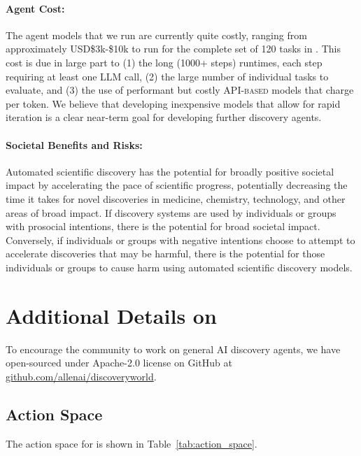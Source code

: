 \paragraph{Agent Cost:} The agent models that we run are currently quite costly, ranging from approximately USD\$3k-\$10k to run for the complete set of 120 tasks in \env.  This cost is due in large part to (1) the long (1000+ steps) runtimes, each step requiring at least one LLM call, (2) the large number of individual tasks to evaluate, and (3) the use of performant but costly \textsc{API-based} models that charge per token.  We believe that developing inexpensive models that allow for rapid iteration is a clear near-term goal for developing further discovery agents. 

\paragraph{Societal Benefits and Risks:} Automated scientific discovery has the potential for broadly positive societal impact by accelerating the pace of scientific progress, potentially decreasing the time it takes for novel discoveries in medicine, chemistry, technology, and other areas of broad impact.  If discovery systems are used by individuals or groups with prosocial intentions, there is the potential for broad societal impact.  Conversely, if individuals or groups with negative intentions choose to attempt to accelerate discoveries that may be harmful, there is the potential for those individuals or groups to cause harm using automated scientific discovery models.

\section{Additional Details on \env}
\label{sec:appendix_details_discoveryworld}

To encourage the community to work on general AI discovery agents, we have open-sourced \env under Apache-2.0 license on GitHub at \href{https://github.com/allenai/discoveryworld}{github.com/allenai/discoveryworld}.

\subsection{Action Space}
\label{sec:appendix_action_space}

The action space for \env is shown in Table~\ref{tab:action_space}.

